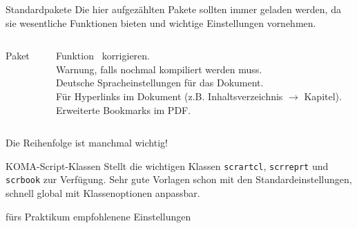 \begin{frame}[fragile]{Standardpakete}
  Die hier aufgezählten Pakete sollten immer geladen werden, da sie wesentliche Funktionen bieten und wichtige Einstellungen vornehmen.
  \begin{columns}[T]
    \begin{column}{0.47\textwidth}
      \begin{block}{Paket}
        \begin{lstverbatim}
        \usepackage{fixltx2e}
        \usepackage[aux]{rerunfilecheck}

        \usepackage[main=ngerman]{babel}


        \usepackage[unicode,pdfusetitle]{hyperref}
        \usepackage{bookmark}
        \end{lstverbatim}
      \end{block}
    \end{column}
    \begin{column}{0.47\textwidth}
      \begin{block}{Funktion}
        \LaTeXe\ korrigieren. \\
        Warnung, falls nochmal kompiliert werden muss. \\
        Deutsche Spracheinstellungen für das Dokument. \\[2\baselineskip]
        Für Hyperlinks im Dokument (z.B. Inhaltsverzeichnis $\rightarrow$ Kapitel). \\
        Erweiterte Bookmarks im PDF.
      \end{block}
    \end{column}
  \end{columns}

  \vspace{5pt}
  Die Reihenfolge ist manchmal wichtig!
\end{frame}

\begin{frame}[fragile]{
  KOMA-Script-Klassen
  \hfill{}
}
  Stellt die wichtigen Klassen \texttt{scrartcl}, \texttt{scrreprt} und \texttt{scrbook} zur Verfügung.
  Sehr gute Vorlagen schon mit den Standardeinstellungen, schnell global mit Klassenoptionen anpassbar.
  \begin{block}{fürs Praktikum empfohlenene Einstellungen}
  \end{block}
\end{frame}
